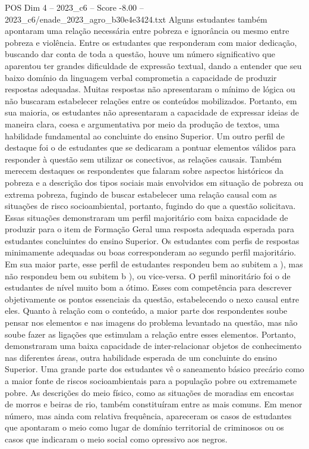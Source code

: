 \begin{textsample}{POS Dim 4 – 2023\_c6 – Score -8.00 – 2023\_c6/enade\_2023\_agro\_b30e4e3424.txt}
Alguns estudantes também apontaram uma relação necessária entre pobreza e ignorância ou mesmo entre pobreza e violência.
Entre os estudantes que responderam com maior dedicação, buscando dar conta de toda a questão, houve um número significativo que aparentou ter grandes dificuldade de expressão textual, dando a entender que seu baixo domínio da linguagem verbal comprometia a capacidade de produzir respostas adequadas.
Muitas respostas não apresentaram o mínimo de lógica ou não buscaram estabelecer relações entre os conteúdos mobilizados.
Portanto, em sua maioria, os estudantes não apresentaram a capacidade de expressar ideias de maneira clara, coesa e argumentativa por meio da produção de textos, uma habilidade fundamental ao concluinte do ensino Superior.
Um outro perfil de destaque foi o de estudantes que se dedicaram a pontuar elementos válidos para responder à questão sem utilizar os conectivos, as relações causais.
Também merecem destaques os respondentes que falaram sobre aspectos históricos da pobreza e a descrição dos tipos sociais mais envolvidos em situação de pobreza ou extrema pobreza, fugindo de buscar estabelecer uma relação causal com as situações de risco socioambiental, portanto, fugindo do que a questão solicitava.
Essas situações demonstraram um perfil majoritário com baixa capacidade de produzir para o item de Formação Geral uma resposta adequada esperada para estudantes concluintes do ensino Superior.
Os estudantes com perfis de respostas minimamente adequadas ou boas corresponderam ao segundo perfil majoritário.
Em sua maior parte, esse perfil de estudantes respondeu bem ao subitem a ), mas não respondeu bem ou subitem b ), ou vice-versa.
O perfil minoritário foi o de estudantes de nível muito bom a ótimo.
Esses com competência para descrever objetivamente os pontos essenciais da questão, estabelecendo o nexo causal entre eles.
Quanto à relação com o conteúdo, a maior parte dos respondentes soube pensar nos elementos e nas imagens do problema levantado na questão, mas não soube fazer as ligações que estimulam a relação entre esses elementos.
Portanto, demonstraram uma baixa capacidade de inter-relacionar objetos de conhecimento nas diferentes áreas, outra habilidade esperada de um concluinte do ensino Superior.
Uma grande parte dos estudantes vê o saneamento básico precário como a maior fonte de riscos socioambientais para a população pobre ou extremamete pobre.
As descrições do meio físico, como as situações de moradias em encostas de morros e beiras de rio, também constituíram entre as mais comuns.
Em menor número, mas ainda com relativa frequência, apareceram os casos de estudantes que apontaram o meio como lugar de domínio territorial de criminosos ou os casos que indicaram o meio social como opressivo aos negros.

\end{textsample}
